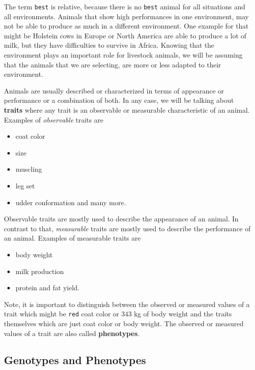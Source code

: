 \documentclass[
]{book}
\providecommand{\tightlist}{%
  \setlength{\itemsep}{0pt}\setlength{\parskip}{0pt}}
\theoremstyle{definition}
\theoremstyle{definition}
\theoremstyle{definition}
\theoremstyle{remark}
\begin{document}
The term \texttt{best} is relative, because there is no \texttt{best} animal for all situations and all environments. Animals that show high performances in one environment, may not be able to produce as much in a different environment. One example for that might be Holstein cows in Europe or North America are able to produce a lot of milk, but they have difficulties to survive in Africa. Knowing that the environment plays an important role for livestock animals, we will be assuming that the animals that we are selecting, are more or less adapted to their environment.

Animals are usually described or characterized in terms of appearance or performance or a combination of both. In any case, we will be talking about \textbf{traits} where any trait is an observable or measurable characteristic of an animal. Examples of \emph{observable} traits are

\begin{itemize}
\tightlist
\item
  coat color
\item
  size
\item
  muscling
\item
  leg set
\item
  udder conformation and many more.
\end{itemize}

Observable traits are mostly used to describe the appearance of an animal. In contrast to that, \emph{measurable} traits are mostly used to describe the performance of an animal. Examples of measurable traits are

\begin{itemize}
\tightlist
\item
  body weight
\item
  milk production
\item
  protein and fat yield.
\end{itemize}

Note, it is important to distinguish between the observed or measured values of a trait which might be \texttt{red} coat color or \(343\) kg of body weight and the traits themselves which are just coat color or body weight. The observed or measured values of a trait are also called \textbf{phenotypes}.

\hypertarget{geno-pheno}{%
\subsection{Genotypes and Phenotypes}\label{geno-pheno}}
\end{document}
